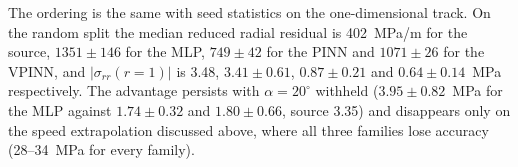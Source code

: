 The ordering is the same with seed statistics on the one-dimensional track. On the random split the median reduced radial residual is 402~MPa/m for the source, $1351\pm146$ for the MLP, $749\pm42$ for the PINN and $1071\pm26$ for the VPINN, and $|\sigma_{rr}(r{=}1)|$ is 3.48, $3.41\pm0.61$, $0.87\pm0.21$ and $0.64\pm0.14$~MPa respectively. The advantage persists with $\alpha=20^\circ$ withheld ($3.95\pm0.82$~MPa for the MLP against $1.74\pm0.32$ and $1.80\pm0.66$, source 3.35) and disappears only on the speed extrapolation discussed above, where all three families lose accuracy (28--34~MPa for every family). %

